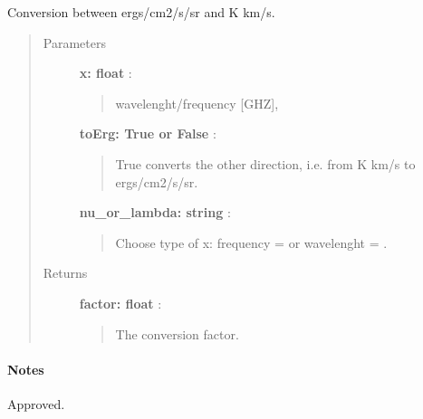 \documentclass[a4paper,10pt,english]{sphinxmanual}
\begin{document}
\begin{fulllineitems}
\label{functions:astrolyze.functions.units.ergToKkms}
Conversion between ergs/cm2/s/sr and K km/s.
\begin{quote}\begin{description}
\item[{Parameters }] \leavevmode
\textbf{x: float} :
\begin{quote}

wavelenght/frequency {[}GHZ{]},
\end{quote}

\textbf{toErg: True or False} :
\begin{quote}

True converts the other direction, i.e. from K km/s to ergs/cm2/s/sr.
\end{quote}

\textbf{nu\_or\_lambda: string} :
\begin{quote}

Choose type of x: frequency =  or wavelenght = .
\end{quote}

\item[{Returns }] \leavevmode
\textbf{factor: float} :
\begin{quote}

The conversion factor.
\end{quote}

\end{description}\end{quote}
\paragraph{Notes}

Approved.

\end{fulllineitems}

\end{document}
